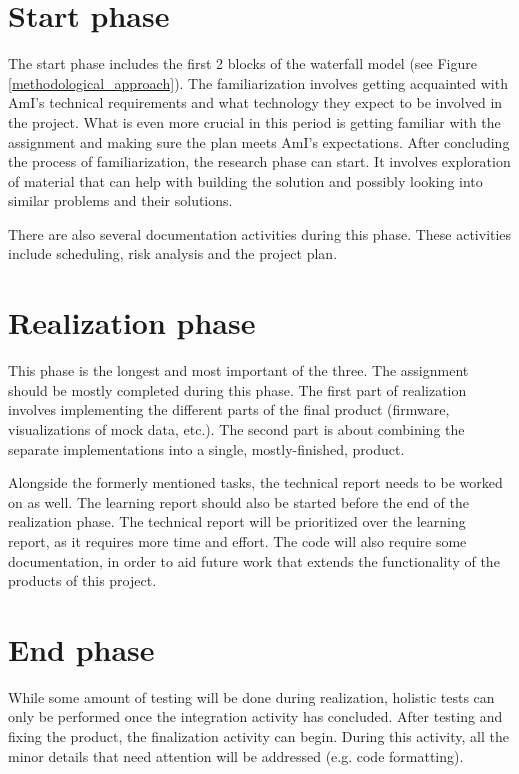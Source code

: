 \documentclass{report}
\begin{document}
	
	\section{Start phase}
	The start phase includes the first 2 blocks of the waterfall model (see Figure \ref{methodological_approach}). The familiarization involves getting acquainted with AmI's technical requirements and what technology they expect to be involved in the project. What is even more crucial in this period is getting familiar with the assignment and making sure the plan meets AmI's expectations. After concluding the process of familiarization, the research phase can start. It involves exploration of material that can help with building the solution and possibly looking into similar problems and their solutions. 
	
	There are also several documentation activities during this phase. These activities include scheduling, risk analysis and the project plan. 
	\section{Realization phase}
	This phase is the longest and most important of the three. The assignment should be mostly completed during this phase. The first part of realization involves implementing the different parts of the final product (firmware, visualizations of mock data, etc.). The second part is about combining the separate implementations into a single, mostly-finished, product.
	
	Alongside the formerly mentioned tasks, the technical report needs to be worked on as well. The learning report should also be started before the end of the realization phase. The technical report will be prioritized over the learning report, as it requires more time and effort. The code will also require some documentation, in order to aid future work that extends the functionality of the products of this project. 
	
	\section{End phase}\label{end_phase}
	While some amount of testing will be done during realization, holistic tests can only be performed once the integration activity has concluded. After testing and fixing the product, the finalization activity can begin. During this activity, all the minor details that need attention will be addressed (e.g. code formatting).
	
\end{document}
